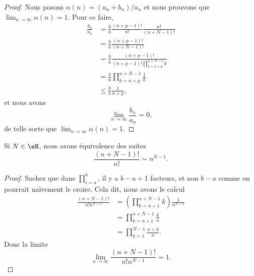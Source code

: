 \begin{proof}
    Nous posons \( \alpha(n)=(a_n+b_n)/a_n\) et nous prouvons que \( \lim_{n\to \infty} \alpha(n)=1\). Pour ce faire,
    \begin{subequations}
        \begin{align}
        \frac{ b_n }{ a_n }&=\frac{ b }{ a }\frac{ (n+p-1)! }{ n! }\frac{ n! }{ (n+N-1)! }\\
        &=\frac{ b }{ a }\frac{ (n+p-1)! }{ (n+N-1)! }\\
        &=\frac{ b }{ a }\frac{ (n+p-1)! }{ (n+p-1)!\prod_{k=n+p}^{n+N-1}k }\\
        &=\frac{ b }{ a }\prod_{k=n+p}^{n+N-1}\frac{1}{ k }\\
        &\leq \frac{ b }{ a }\frac{1}{ n+p },
        \end{align}
    \end{subequations}
    et nous avons
    \begin{equation}
        \lim_{n\to \infty} \frac{ b_n }{ a_n }=0, 
    \end{equation}
    de telle sorte que \( \lim_{n\to \infty} \alpha(n)=1\).
\end{proof}

\begin{lemma}       \label{LEMooTGHHooZHZsgE}
    Si \( N\in \eN\), nous avons équivalence des suites
    \begin{equation}
        \frac{ (n+N-1)! }{ n! }\sim n^{N-1}.
    \end{equation}
\end{lemma}

\begin{proof}
    Sachez que dans \( \prod_{i=a}^b\), il y a \( b-a+1\) facteurs, et non \( b-a\) comme on pourrait naïvement le croire. Cela dit, nous avons le calcul
    \begin{subequations}
        \begin{align}
            \frac{ (n+N-1)! }{ n!n^{N-1} }&=\left( \prod_{k=n+1}^{n+N-1}k \right)\frac{1}{ n^{N-1} }\\
            &=\prod_{k=n+1}^{n+N-1}\frac{ k }{ n }\\
            &=\prod_{k=1}^{N-1}\frac{ n+k }{ n }.
        \end{align}
    \end{subequations}
    Donc la limite
    \begin{equation}
        \lim_{n\to \infty} \frac{ (n+N-1)! }{ n!n^{N-1} }=1.
    \end{equation}
\end{proof}

